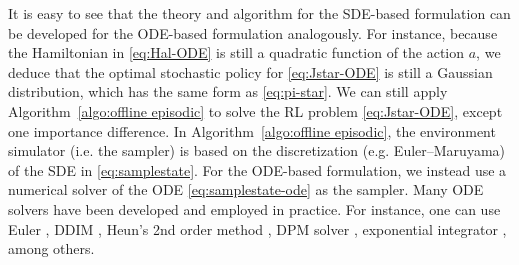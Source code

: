 \documentclass[11pt]{article}
\begin{document}
It is easy to see that the theory and algorithm for the SDE-based formulation can be developed for the ODE-based formulation analogously. For instance, because the Hamiltonian in \eqref{eq:Hal-ODE} is still a quadratic function of the action $a$, we deduce that the optimal stochastic policy for \eqref{eq:Jstar-ODE} is still a Gaussian distribution, which has the same form as \eqref{eq:pi-star}. We can still apply Algorithm~\ref{algo:offline episodic} to solve the RL problem \eqref{eq:Jstar-ODE}, except one importance difference. In Algorithm~\ref{algo:offline episodic}, the environment simulator (i.e. the sampler) is based on the discretization (e.g. Euler--Maruyama) of the SDE in \eqref{eq:samplestate}. For the ODE-based formulation, we instead use a numerical solver of the ODE \eqref{eq:samplestate-ode} as the sampler. Many ODE solvers have been developed and employed in practice. For instance, one can use Euler \citep{SongICLR2021}, DDIM \citep{song2020denoising}, Heun's 2nd order method \citep{Karras2022}, DPM solver \citep{lu2022dpm}, exponential integrator \citep{zhang2023fast}, among others.
\end{document}
